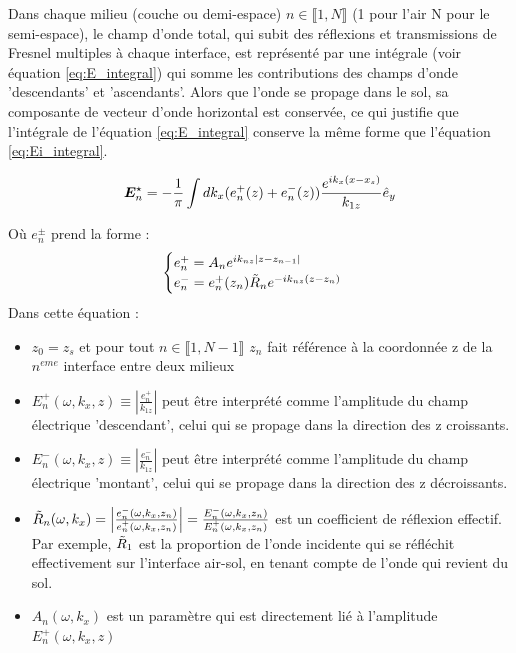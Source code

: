 Dans chaque milieu (couche ou demi-espace) $n\in \llbracket 1, N \rrbracket$ (1 pour l'air N pour le semi-espace), le champ d'onde total, qui subit des réflexions et transmissions de Fresnel multiples à chaque interface, est représenté par une intégrale (voir équation \eqref{eq:E_integral}) qui somme les contributions des champs d'onde 'descendants' et 'ascendants'.
Alors que l'onde se propage dans le sol, sa composante de vecteur d'onde horizontal est conservée, ce qui justifie que l'intégrale de l'équation \eqref{eq:E_integral} conserve la même forme que l'équation \eqref{eq:Ei_integral}.

\begin{equation}
\bm{E}^\star_n = - \frac{1}{\pi} \int dk_x (e_n^+(z)+e_n^-(z)) \frac{e^{ik_x(x-x_s)} }{ k_{1z}} \hat{e}_y
\label{eq:E_integral}
\end{equation}

Où $e_n^\pm$ prend la forme \cite{chew1999waves} :
\begin{equation}
 \begin{cases}
 e_n^+ = A_n e^{ik_{nz}|z-z_{n-1}|} \\
e_n^- = e_n^+(z_n) \Tilde{R}_n e^{-i k_{nz}(z-z_n)}\\
\end{cases}
\end{equation}
Dans cette équation : \par
\begin{itemize}
\item $z_0=z_s$ et pour tout $n\in \llbracket 1,N-1 \rrbracket$ $z_n$ fait référence à la coordonnée z de la $n^{eme}$ interface entre deux milieux
\item $E_n^+(\omega,k_x,z) \equiv \left| \frac{e_n^+}{k_{1z}} \right|$ peut être interprété comme l'amplitude du champ électrique 'descendant', celui qui se propage dans la direction des z croissants.
\item $E_n^-(\omega,k_x,z) \equiv \left| \frac{e_n^-}{k_{1z}} \right|$ peut être interprété comme l'amplitude du champ électrique 'montant', celui qui se propage dans la direction des z décroissants.
 \item $\Tilde{R}_n(\omega,k_x) = \left|\frac{e_n^-(\omega,k_x,z_n)}{e_n^+(\omega,k_x,z_n)} \right| = \frac{E_n^-(\omega,k_x,z_n)}{E_n^+(\omega,k_x,z_{n})}$ est un coefficient de réflexion effectif. Par exemple, $\Tilde{R}_1$ est la proportion de l'onde incidente qui se réfléchit effectivement sur l'interface air-sol, en tenant compte de l'onde qui revient du sol.
\item $A_n(\omega,k_x)$ est un paramètre qui est directement lié à l'amplitude $E_n^+(\omega,k_x,z)$
\end{itemize}

